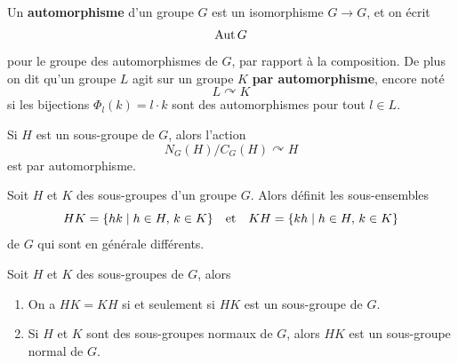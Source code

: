 \begin{definition}
	Un \textbf{automorphisme} d'un groupe $G$ est un isomorphisme $G \to G$, et on écrit
	\[
	\operatorname{Aut} G
	\]
	pour le groupe des automorphismes de $G$, par rapport à la composition. De plus on dit qu'un groupe $L$ agit sur un groupe $K$ \textbf{par automorphisme}, encore noté
	\[
	L \curvearrowright K
	\]
	si les bijections $\Phi_l(k) = l \cdot k$ sont des automorphismes pour tout $l \in L$.
\end{definition}

\begin{lemme}
	Si $H$ est un sous-groupe de $G$, alors l'action
	\[
		N_G(H) / C_G(H) \curvearrowright H
	\]
	est par automorphisme.
\end{lemme}



\begin{definition}
	Soit $H$ et $K$ des sous-groupes d'un groupe $G$. Alors définit les sous-ensembles
	\[
	HK = \{hk \mid h \in H, \, k \in K\} \quad \text{et} \quad KH = \{kh \mid h \in H, \, k \in K\}
	\]
	de $G$ qui sont en générale différents.
\end{definition}


\begin{proposition}
	Soit $H$ et $K$ des sous-groupes de $G$, alors
	\begin{enumerate}
		\item On a $HK = KH$ si et seulement si $HK$ est un sous-groupe de $G$.
		\item Si $H$ et $K$ sont des sous-groupes normaux de $G$, alors $HK$ est un sous-groupe normal de $G$.
	\end{enumerate}
\end{proposition}



